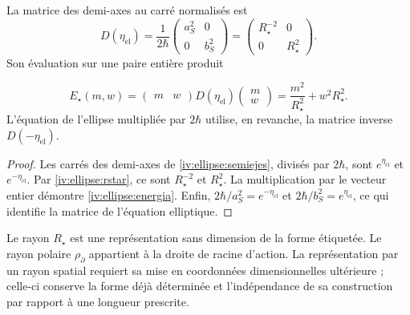 \begin{proposition}
\label{iv:ellipse:matriz-prop}
La matrice des demi-axes au carré normalisés est
\begin{equation}
 D(\eta_{\mathrm{el}})
 =\frac1{2\hbar}
    \begin{pmatrix}a_S^2&0\\0&b_S^2\end{pmatrix}
 =\begin{pmatrix}R_\star^{-2}&0\\0&R_\star^2\end{pmatrix}.
 \label{iv:ellipse:matriz}
\end{equation}
Son évaluation sur une paire entière produit

\begin{equation}
 E_\star(m,w)=
 \begin{pmatrix}m&w\end{pmatrix}
 D(\eta_{\mathrm{el}})
 \begin{pmatrix}m\\w\end{pmatrix}
 =\frac{m^2}{R_\star^2}+w^2R_\star^2.
 \label{iv:ellipse:energia}
\end{equation}
L’équation de l’ellipse multipliée par \(2\hbar\)
utilise, en revanche, la matrice inverse \(D(-\eta_{\mathrm{el}})\).
\end{proposition}
\begin{proof}
Les carrés des demi-axes de
\eqref{iv:ellipse:semiejes}, divisés par \(2\hbar\),
sont \(e^{\eta_{\mathrm{el}}}\) et
\(e^{-\eta_{\mathrm{el}}}\).
Par \eqref{iv:ellipse:rstar}, ce sont
\(R_\star^{-2}\) et \(R_\star^2\).
La multiplication par le vecteur entier démontre
\eqref{iv:ellipse:energia}. Enfin,
\(2\hbar/a_S^2=e^{-\eta_{\mathrm{el}}}\) et
\(2\hbar/b_S^2=e^{\eta_{\mathrm{el}}}\), ce qui
identifie la matrice de l’équation elliptique.

\end{proof}

Le rayon \(R_\star\) est une représentation sans dimension de
la forme étiquetée. Le rayon polaire
\(\rho_{\partial}\) appartient à la droite de racine d’action.
La représentation par un rayon spatial requiert sa mise en coordonnées
dimensionnelles ultérieure ; celle-ci conserve la forme déjà déterminée
et l’indépendance de sa construction par rapport à une
longueur prescrite.
